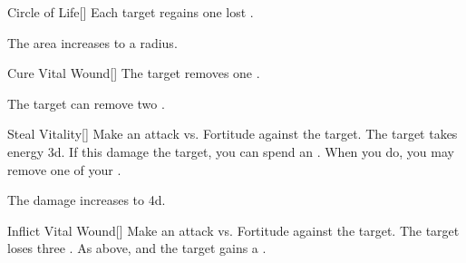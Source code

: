 \lowercase{\hypertarget{spell:Circle of Life}{}}\label{spell:Circle of Life}
\begin{freeability}[Rank 5]{\hypertarget{spell:Circle of Life}{Circle of Life}}[]
Each target regains one lost .

\rankline
{} The area increases to a \arealarge radius.
\end{freeability}
\vspace{0.25em}



\lowercase{\hypertarget{spell:Cure Vital Wound}{}}\label{spell:Cure Vital Wound}
\begin{apability}[Rank 5]{\hypertarget{spell:Cure Vital Wound}{Cure Vital Wound}}[]
The target removes one .

\rankline
{} The target can remove two .
\end{apability}
\vspace{0.25em}



\lowercase{\hypertarget{spell:Steal Vitality}{}}\label{spell:Steal Vitality}
\begin{freeability}[Rank 5]{\hypertarget{spell:Steal Vitality}{Steal Vitality}}[]
Make an attack vs. Fortitude against the target.
\hit The target takes energy  \plus3d.
If this damage  the target, you can spend an .
When you do, you may remove one of your .

\rankline
{} The damage increases to  \plus4d.
\end{freeability}
\vspace{0.25em}



\lowercase{\hypertarget{spell:Inflict Vital Wound}{}}\label{spell:Inflict Vital Wound}
\begin{freeability}[Rank 7]{\hypertarget{spell:Inflict Vital Wound}{Inflict Vital Wound}}[]
Make an attack vs. Fortitude against the target.
\hit The target loses three .
\crit As above, and the target gains a .
\end{freeability}
\vspace{0.25em}



